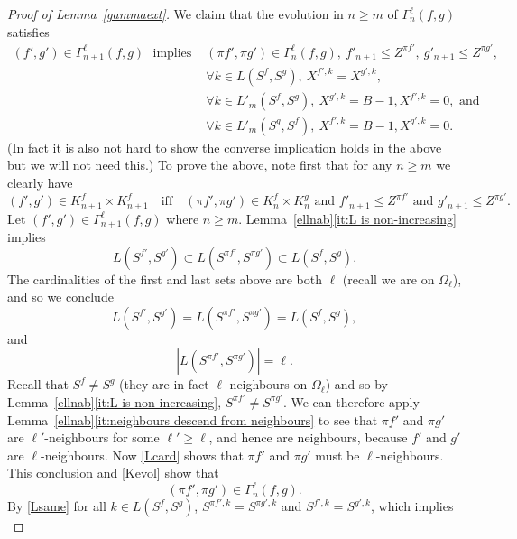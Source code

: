 \documentclass[10pt,a4paper]{amsart}
\begin{document}
\begin{proof}[Proof of Lemma~\ref{gammaext}]
We claim that the evolution in $n\ge m$ of  $\Gamma^\ell_n(f,g)$ satisfies
\begin{align}\label{gammaevol}
(f',g')\in \Gamma^\ell_{n+1}(f,g)\ \ \ \text{implies }&(\pi f',\pi g')\in\Gamma^\ell_n(f,g),\ f'_{n+1}\le Z^{\pi f'},\ g'_{n+1}\le Z^{\pi g'},\\ \nonumber&\forall k\in L(S^f,S^g), \ X^{f',k}=X^{g',k},\\
\nonumber&\forall k\in L'_m(S^f,S^g), \ X^{g',k}=B-1, X^{f',k}=0,\text{ and}\\
\nonumber&\forall k\in L'_m(S^g,S^f), \ X^{f',k}=B-1, X^{g',k}=0.
\end{align}
(In fact it is also not hard to show the converse implication holds in the above but we will not need this.)  To prove the above, note first that for any $n\ge m$ we clearly have
\begin{equation}\label{Kevol}
(f',g')\in K^f_{n+1}\times K^f_{n+1}\quad \text{iff} \quad (\pi f',\pi g')\in K^f_n\times K^g_n \text{ and } f'_{n+1}\le Z^{\pi f'}\text{ and }g'_{n+1}\le Z^{\pi g'}.
\end{equation}
Let $(f',g')\in \Gamma^\ell_{n+1}(f,g)$ where $n\ge m$. Lemma~\ref{ellnab}\ref{it:L is non-increasing} implies
\[L(S^{f'},S^{g'})\subset L(S^{\pi f'},S^{\pi g'})\subset L(S^f,S^g).\]
The cardinalities of the first and last sets above are both $\ell$ (recall we are on $\Omega_\ell$), and so we conclude
\begin{equation}\label{Lsame}
L(S^{f'},S^{g'})=L(S^{\pi f'},S^{\pi g'})=L(S^f,S^g),
\end{equation}
and
\begin{equation}\label{Lcard}
|L(S^{\pi f'},S^{\pi g'})|=\ell.
\end{equation}
Recall that $S^f\neq S^g$ (they are in fact $\ell$-neighbours on $\Omega_\ell$) and so by Lemma~\ref{ellnab}\ref{it:L is non-increasing}, $S^{\pi f'}\neq S^{\pi g'}$. 
We can therefore apply Lemma~\ref{ellnab}\ref{it:neighbours descend from neighbours} to see that $\pi f'$ and $\pi g'$ are $\ell'$-neighbours for some $\ell'\ge \ell$, and hence are neighbours, because $f'$ and $g'$ are $\ell$-neighbours.  
Now \eqref{Lcard} shows that $\pi f'$ and $\pi g'$ must be $\ell$-neighbours.  
This conclusion and \eqref{Kevol} show that 
\begin{equation}\label{piinG}
(\pi f',\pi g')\in \Gamma_n^\ell(f,g).
\end{equation}
By \eqref{Lsame} for all $k\in L(S^f,S^g)$, $S^{\pi f',k}=S^{\pi g',k}$ and $S^{f',k}=S^{g',k}$, which implies
\begin{equation}\label{equalonL}

\end{equation}
\end{proof}
\end{document}
